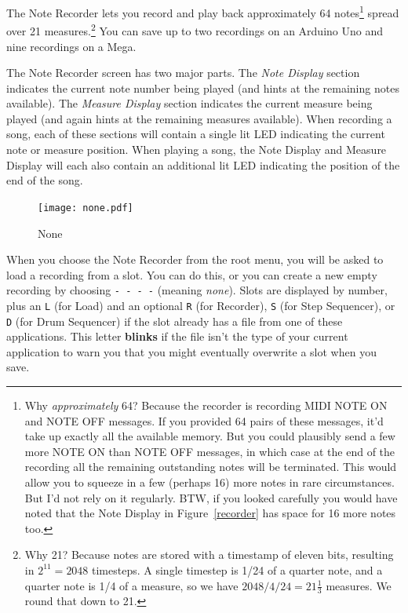 \documentclass{article}
\begin{document}
The Note Recorder lets you record and play back approximately 64 notes\footnote{Why {\it approximately} 64? Because the recorder is recording MIDI NOTE ON and NOTE OFF messages.  If you provided 64 pairs of these messages, it'd take up exactly all the available memory.  But you could plausibly send a few more NOTE ON than NOTE OFF messages, in which case at the end of the recording all the remaining outstanding notes will be terminated.  This would allow you to squeeze in a few (perhaps 16) more notes in rare circumstances.  But I'd not rely on it regularly.  BTW, if you looked carefully you would have noted that the Note Display in Figure~\ref{recorder} has space for 16 more notes too.} spread over 21 measures.\footnote{Why 21?  Because notes are stored with a timestamp of eleven bits, resulting in \(2^{11} = 2048\) timesteps.  A single timestep is 1/24 of a quarter note, and a quarter note is 1/4 of a measure, so we have \(2048 / 4 / 24 = 21 \frac{1}{3}\) measures.  We round that down to 21.}  You can save up to two recordings on an Arduino Uno and nine recordings on a Mega.

The Note Recorder screen has two major parts.  The {\it Note Display} section indicates the current note number being played (and hints at the remaining notes available).  The {\it Measure Display} section indicates the current measure being played (and again hints at the remaining measures available).  When recording a song, each of these sections will contain a single lit LED indicating the current note or measure position.  When playing a song, the Note Display and Measure Display will each also contain an additional lit LED indicating the position of the end of the song.

\begin{figure}
\texttt{[image: none.pdf]}
\vspace{-2em}\caption{\small None}\vspace{-1em}
\label{none}
\end{figure}

When you choose the Note Recorder from the root menu, you will be asked to load a recording from a slot.  You can do this, or you can create a new empty recording by choosing \texttt{-~-~-~-} (meaning {\it none}).  Slots are displayed by number, plus an \texttt{L} (for Load) and an optional \texttt{R} (for Recorder), \texttt{S} (for Step Sequencer), or \texttt{D} (for Drum Sequencer) if the slot already has a file from one of these applications.  This letter {\bf blinks} if the file isn't the type of your current application to warn you that you might eventually overwrite a slot when you save.
\end{document}
